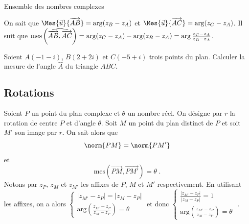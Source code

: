 \begin{chapter}{Ensemble des nombres complexes}
\begin{figure}[h!]
		\end{figure}
%
      On sait que $\Mes{\vec{u}}{\overrightarrow{AB}} = \arg(z_B - z_A)$ et 
      $\Mes{\vec{u}}{\overrightarrow{AC}} = \arg(z_C - z_A)$.
      Il suit que 
      $\mathrm{mes}\left( \widehat{ \overrightarrow{AB} , \overrightarrow{AC} } \right) = \arg(z_C-z_A)-\arg(z_B-z_A)=\arg\frac{z_C - z_A}{z_B - z_A}$.
\begin{exe}
\label{exe:angle}
Soient $A (-1 - i)$, $B (2 + 2 i)$ et $C (-5 + i ) $ trois points du plan.
Calculer la mesure de l'angle $\hat{A}$ du triangle $ABC$.
\end{exe}
%
\subsection{Rotations}
%
%
Soient $P$ un point du plan complexe et $\theta$ un nombre r\'eel.
On d\'esigne par $r$ la rotation de centre $P$ et d'angle $\theta$.
Soit $M$ un point du plan distinct de $P$ et soit $M'$ son image par $r$.
On sait alors que 
\begin{equation}
\norm{PM} = \norm{PM'} 
\label{eq:1}
\end{equation}
et 
\begin{equation}
\mathrm{mes}\left(\overrightarrow{PM} , \overrightarrow{PM'} \right) = \theta \; .
\label{eq:2}
\end{equation}
Notons par $z_P$, $z_M$ et $z_{M'}$ les affixes de $P$, $M$ et $M'$ respectivement.
En utilisant les affixes, on a alors 
$
\left\lbrace
\begin{matrix}
| z_{M'} - z_P | = | z_M - z_P | \\
\text{arg} \left( \frac{z_{M'} - z_P}{z_M - z_P } \right) = \theta
\end{matrix}
\right.
$
et donc 
$
\left\lbrace
\begin{matrix}
\frac{| z_{M'} - z_P |}{| z_M - z_P |} = 1 \\
\text{arg} \left( \frac{z_{M'} - z_P}{z_M - z_P } \right) = \theta
\end{matrix}
\right.
$
. 


\end{chapter}
